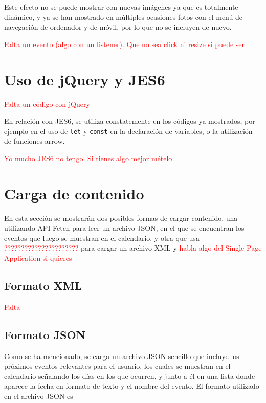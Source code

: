 \documentclass[11pt, a4paper]{book}
\begin{document}
	Este efecto no se puede mostrar con nuevas imágenes ya que es totalmente dinámico, y ya se han mostrado en múltiples ocasiones fotos con el menú de navegación de ordenador y de móvil, por lo que no se incluyen de nuevo.
	
	\begin{Huge}
		\textcolor{red}{Falta un evento (algo con un listener). Que no sea click ni resize si puede ser}
	\end{Huge}
	
	\section{Uso de jQuery y JES6}
	\begin{Huge}
		\textcolor{red}{Falta un código con jQuery}
	\end{Huge}

	En relación con JES6, se utiliza constatemente en los códigos ya mostrados, por ejemplo en el uso de \texttt{let} y \texttt{const} en la declaración de variables, o la utilización de funciones arrow.
	\begin{Huge}
		\textcolor{red}{Yo mucho JES6 no tengo. Si tienes algo mejor mételo}
	\end{Huge}
	
	\section{Carga de contenido}
	En esta sección se mostrarán dos posibles formas de cargar contenido, una utilizando API Fetch para leer un archivo JSON, en el que se encuentran los eventos que luego se muestran en el calendario, y otra que usa \textcolor{red}{??????????????????????} para cargar un archivo XML y \textcolor{red}{habla algo del Single Page Application si quieres}
	\subsection{Formato XML}
	\begin{Huge}
		\textcolor{red}{Falta -----------------------------------}
	\end{Huge}

	\subsection{Formato JSON}
	Como se ha mencionado, se carga un archivo JSON sencillo que incluye los próximos eventos relevantes para el usuario, los cuales se muestran en el calendario señalando los días en los que ocurren, y junto a él en una lista donde aparece la fecha en formato de texto y el nombre del evento. El formato utilizado en el archivo JSON es
	
\end{document}
